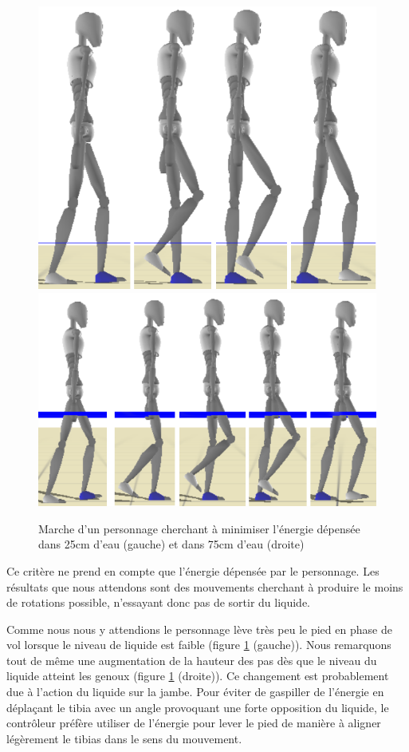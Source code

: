 \documentclass[runningheads,a4paper]{llncs}
\begin{document}
\begin{figure}[h]
\centering
\includegraphics[scale=0.28]{strips/min_torque_25cm.png}
\includegraphics[scale=0.37]{strips/min_torque_75cm.png}
\caption{Marche d'un personnage cherchant à minimiser l'énergie dépensée dans 25cm d'eau (gauche) et dans 75cm d'eau (droite)}
\label{fig:min_energ}
\end{figure}


Ce critère ne prend en compte que l'énergie dépensée par le personnage. Les résultats que nous attendons sont des mouvements cherchant à produire le moins de rotations possible, n'essayant donc pas de sortir du liquide.

Comme nous nous y attendions le personnage lève très peu le pied en phase de vol lorsque le niveau de liquide est faible (figure \ref{fig:min_energ} (gauche)). Nous remarquons tout de même une augmentation de la hauteur des pas dès que le niveau du liquide atteint les genoux (figure \ref{fig:min_energ} (droite)). Ce changement est probablement due à l'action du liquide sur la jambe. Pour éviter de gaspiller de l'énergie en déplaçant le tibia avec un angle provoquant une forte opposition du liquide, le contrôleur préfère utiliser de l'énergie pour lever le pied de manière à aligner légèrement le tibias dans le sens du mouvement. 
\end{document}
